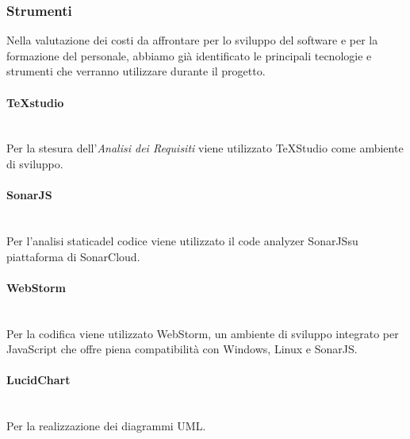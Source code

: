 \subsubsection{Strumenti}
Nella valutazione dei costi da affrontare per lo sviluppo del software e per la formazione del personale, abbiamo già identificato le principali tecnologie e strumenti che verranno utilizzare durante il progetto\glo.
\paragraph{TeXstudio}\mbox{}\\ [1mm]
Per la stesura dell'\textit{Analisi dei Requisiti} viene utilizzato TeXStudio come ambiente di sviluppo.
\paragraph{SonarJS}\mbox{}\\ [1mm]
Per l'analisi statica\glosp del codice viene utilizzato il code analyzer SonarJS\glosp su piattaforma di SonarCloud.
\paragraph{WebStorm}\mbox{}\\ [1mm]
Per la codifica viene utilizzato WebStorm, un ambiente di sviluppo integrato per JavaScript che offre piena compatibilità con Windows, Linux e SonarJS\glo.
\paragraph{LucidChart}\mbox{}\\ [1mm]
Per la realizzazione dei diagrammi UML\glo.	